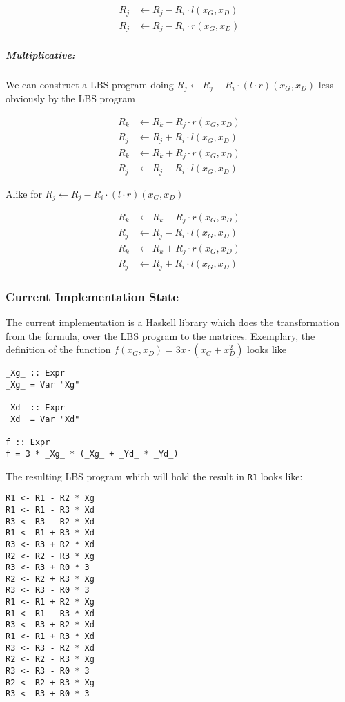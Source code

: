 \documentclass[12pt, a4paper]{article}
\begin{document}
\begin{align*}
R_j & \leftarrow R_j - R_i \cdot l(x_G, x_D) \\
R_j & \leftarrow R_j - R_i \cdot r(x_G, x_D)
\end{align*}


\subparagraph{Multiplicative:} We can construct a LBS program doing $R_j
\leftarrow R_j + R_i \cdot (l \cdot r)(x_G, x_D)$ less obviously by the LBS program

\begin{align*}
R_k & \leftarrow R_k - R_j \cdot r(x_G, x_D) \\
R_j & \leftarrow R_j + R_i \cdot l(x_G, x_D) \\
R_k & \leftarrow R_k + R_j \cdot r(x_G, x_D) \\
R_j & \leftarrow R_j - R_i \cdot l(x_G, x_D)
\end{align*}

Alike for $R_j \leftarrow R_j - R_i \cdot (l \cdot r)(x_G, x_D)$

\begin{align*}
R_k & \leftarrow R_k - R_j \cdot r(x_G, x_D) \\
R_j & \leftarrow R_j - R_i \cdot l(x_G, x_D) \\
R_k & \leftarrow R_k + R_j \cdot r(x_G, x_D) \\
R_j & \leftarrow R_j + R_i \cdot l(x_G, x_D)
\end{align*}


\subsubsection{Current Implementation State}

The current implementation is a Haskell library which does the transformation
from the formula, over the LBS program to the matrices. Exemplary,
the definition of the function $f(x_G,x_D) = 3x \cdot (x_G + x_D^2)$ looks like

\lstset{language=Haskell}

\begin{lstlisting}
_Xg_ :: Expr
_Xg_ = Var "Xg"

_Xd_ :: Expr
_Xd_ = Var "Xd"

f :: Expr
f = 3 * _Xg_ * (_Xg_ + _Yd_ * _Yd_)
\end{lstlisting}

\noindent{}The resulting LBS program which will hold the result in \texttt{R1}
looks like:

\begin{lstlisting}
R1 <- R1 - R2 * Xg
R1 <- R1 - R3 * Xd
R3 <- R3 - R2 * Xd
R1 <- R1 + R3 * Xd
R3 <- R3 + R2 * Xd
R2 <- R2 - R3 * Xg
R3 <- R3 + R0 * 3
R2 <- R2 + R3 * Xg
R3 <- R3 - R0 * 3
R1 <- R1 + R2 * Xg
R1 <- R1 - R3 * Xd
R3 <- R3 + R2 * Xd
R1 <- R1 + R3 * Xd
R3 <- R3 - R2 * Xd
R2 <- R2 - R3 * Xg
R3 <- R3 - R0 * 3
R2 <- R2 + R3 * Xg
R3 <- R3 + R0 * 3
\end{lstlisting}
\end{document}
